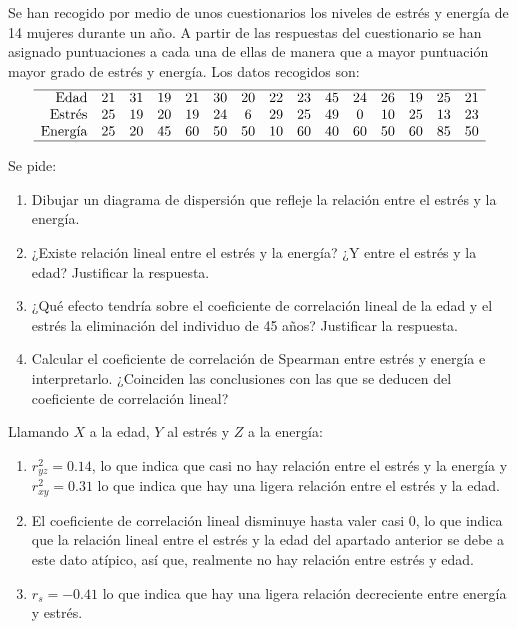 {Se han recogido por medio de unos cuestionarios los niveles de estrés y energía de 14 mujeres durante un año. A partir
de las respuestas del cuestionario se han asignado puntuaciones a cada una de ellas de manera que a mayor puntuación
mayor grado de estrés y energía. Los datos recogidos son:
\[
\begin{array}{rcccccccccccccc}
\hline
\mbox{Edad}   & 21 & 31 & 19 & 21 & 30 & 20 & 22 & 23 & 45 & 24 & 26 & 19 & 25 & 21\\
\mbox{Estrés} & 25 & 19 & 20 & 19 & 24 &  6 & 29 & 25 & 49 &  0 & 10 & 25 & 13 & 23\\
\mbox{Energía}& 25 & 20 & 45 & 60 & 50 & 50 & 10 & 60 & 40 & 60 & 50 & 60 & 85 & 50\\
\hline
\end{array}
\]

Se pide:
\begin{enumerate}
\item Dibujar un diagrama de dispersión que refleje la relación entre el estrés y la energía.
\item ¿Existe relación lineal entre el estrés y la energía?
¿Y entre el estrés y la edad?
Justificar la respuesta.
\item ¿Qué efecto tendría sobre el coeficiente de correlación lineal de la edad y el estrés la eliminación del individuo
de 45 años? Justificar la respuesta.
\item Calcular el coeficiente de correlación de Spearman entre estrés y energía e interpretarlo.
¿Coinciden las conclusiones con las que se deducen del coeficiente de correlación lineal?
\end{enumerate}
}
{Llamando $X$ a la edad, $Y$ al estrés y $Z$ a la energía:
\begin{enumerate}[start=2]
\item $r^2_{yz}=0.14$, lo que indica que casi no hay relación entre el estrés y la energía y $r^2_{xy}=0.31$ lo que
indica que hay una ligera relación entre el estrés y la edad.
\item El coeficiente de correlación lineal disminuye hasta valer casi 0, lo que indica que la relación lineal entre el
estrés y la edad del apartado anterior se debe a este dato atípico, así que, realmente no hay relación entre estrés y
edad.
\item $r_s=-0.41$ lo que indica que hay una ligera relación decreciente entre energía y estrés.
\end{enumerate}
}
{}

